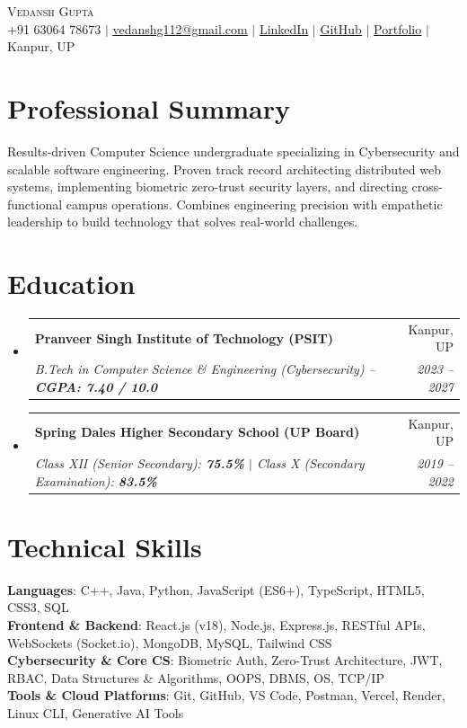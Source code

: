 \documentclass[letterpaper,10pt]{article}
\makeatletter
\newcommand{\resumeSubheading}[4]{
  \vspace{-1pt}\item
    \begin{tabular*}{0.98\textwidth}[t]{l@{\extracolsep{\fill}}r}
      \textbf{#1} & #2 \\
      \textit{\small#3} & \textit{\small #4} \\
    \end{tabular*}\vspace{-4pt}
}
\newcommand{\resumeSubHeadingListStart}{\begin{itemize}[leftmargin=0.15in, label={}]}
\newcommand{\resumeSubHeadingListEnd}{\end{itemize}}
\makeatother
\begin{document}
\begin{center}
    {\Huge \scshape Vedansh Gupta} \\ \vspace{3pt}
    \small +91 63064 78673 $|$ 
    \href{mailto:vedanshg112@gmail.com}{\underline{vedanshg112@gmail.com}} $|$ 
    \href{https://www.linkedin.com/in/vedansh-gupta/}{\underline{LinkedIn}} $|$ 
    \href{https://github.com/Vedanshg6303}{\underline{GitHub}} $|$ 
    \href{https://vedansh-gupta.vercel.app}{\underline{Portfolio}} $|$ 
    Kanpur, UP
\end{center}

\section{Professional Summary}
 \begin{itemize}[leftmargin=0.15in, label={}]
    \small{\item{
     Results-driven Computer Science undergraduate specializing in Cybersecurity and scalable software engineering. Proven track record architecting distributed web systems, implementing biometric zero-trust security layers, and directing cross-functional campus operations. Combines engineering precision with empathetic leadership to build technology that solves real-world challenges.
    }}
 \end{itemize}

\section{Education}
  \resumeSubHeadingListStart
    \resumeSubheading
      {Pranveer Singh Institute of Technology (PSIT)}{Kanpur, UP}
      {B.Tech in Computer Science \& Engineering (Cybersecurity) \textnormal{--} \textbf{CGPA: 7.40 / 10.0}}{2023 -- 2027}
    \resumeSubheading
      {Spring Dales Higher Secondary School (UP Board)}{Kanpur, UP}
      {Class XII (Senior Secondary): \textbf{75.5\%} \quad $|$ \quad Class X (Secondary Examination): \textbf{83.5\%}}{2019 -- 2022}
  \resumeSubHeadingListEnd

\section{Technical Skills}
 \begin{itemize}[leftmargin=0.15in, label={}]
    \small{\item{
     \textbf{Languages}{: C++, Java, Python, JavaScript (ES6+), TypeScript, HTML5, CSS3, SQL} \\[1pt]
     \textbf{Frontend \& Backend}{: React.js (v18), Node.js, Express.js, RESTful APIs, WebSockets (Socket.io), MongoDB, MySQL, Tailwind CSS} \\[1pt]
     \textbf{Cybersecurity \& Core CS}{: Biometric Auth, Zero-Trust Architecture, JWT, RBAC, Data Structures \& Algorithms, OOPS, DBMS, OS, TCP/IP} \\[1pt]
     \textbf{Tools \& Cloud Platforms}{: Git, GitHub, VS Code, Postman, Vercel, Render, Linux CLI, Generative AI Tools}
    }}
 \end{itemize}
\end{document}
